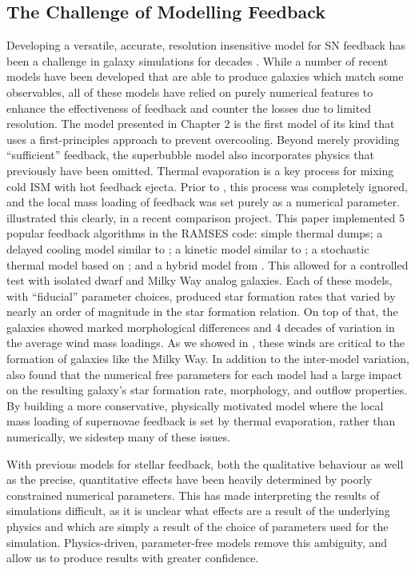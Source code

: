 \subsection{The Challenge of Modelling Feedback}
Developing a versatile, accurate, resolution insensitive model for SN feedback
has been a challenge in galaxy simulations for decades \citep{Katz1992}.  While
a number of recent models have been developed that are able to produce galaxies
which match some observables, all of these models have relied on purely
numerical features to enhance the effectiveness of feedback and counter the
losses due to limited resolution.  The \citet{Keller2014} model presented in
Chapter 2 is the first model of its kind that uses a first-principles approach
to prevent overcooling.  Beyond merely providing ``sufficient'' feedback, the
superbubble model also incorporates physics that previously have been omitted.
Thermal evaporation is a key process for mixing cold ISM with hot feedback
ejecta.  Prior to \citet{Keller2014}, this process was completely ignored, and
the local mass loading of feedback was set purely as a numerical parameter.
\citet{Rosdahl2016} illustrated this clearly, in a recent comparison project.
This paper implemented 5 popular feedback algorithms in the {\sc RAMSES} code:
simple thermal dumps; a delayed cooling model similar to \citet{Agertz2013}; a
kinetic model similar to \citet{DallaVecchia2008}; a stochastic thermal model
based on \citet{DallaVecchia2012}; and a hybrid model from \citet{Kimm2015}.
This allowed for a controlled test with isolated dwarf and Milky Way analog
galaxies. Each of these models, with ``fiducial'' parameter choices, produced
star formation rates that varied by nearly an order of magnitude in the
\citet{Kennicutt1998} star formation relation.  On top of that, the galaxies
showed marked morphological differences and 4 decades of variation in the
average wind mass loadings.  As we showed in \citet{Keller2015}, these winds are
critical to the formation of galaxies like the Milky Way.  In addition to the
inter-model variation, \citet{Rosdahl2016} also found that the numerical free
parameters for each model had a large impact on the resulting galaxy's star
formation rate, morphology, and outflow properties.  By building a more
conservative, physically motivated model where the local mass loading of
supernovae feedback is set by thermal evaporation, rather than numerically, we
sidestep many of these issues.

With previous models for stellar feedback, both the qualitative behaviour as
well as the precise, quantitative effects have been heavily determined by
poorly constrained numerical parameters.  This has made interpreting the results
of simulations difficult, as it is unclear what effects are a result of
the underlying physics and which are simply a result of the choice of parameters
used for the simulation.  Physics-driven, parameter-free models remove this
ambiguity, and allow us to produce results with greater confidence.  


